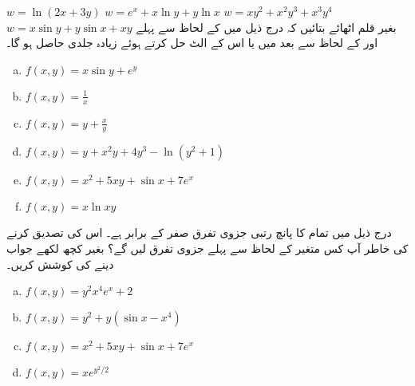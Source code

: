 $w=\ln(2x+3y)$
$w=e^x+x\ln y+y\ln x$
$w=xy^2+x^2y^3+x^3y^4$
$w=x\sin y+y\sin x+xy$
بغیر قلم اٹھائے   بتائیں کہ درج ذیل میں  کے لحاظ سے پہلے اور  کے  لحاظ سے بعد میں یا اس کے الٹ حل کرتے ہوئے   زیادہ جلدی حاصل ہو گا۔
\begin{enumerate}[a.]
\item
$f(x,y)=x\sin y+e^y$
\item
$f(x,y)=\frac{1}{x}$
\item
$f(x,y)=y+\frac{x}{y}$
\item
$f(x,y)=y+x^2y+4y^3-\ln(y^2+1)$
\item
$f(x,y)=x^2+5xy+\sin x+7e^x$
\item
$f(x,y)=x\ln xy$
\end{enumerate}
درج ذیل میں تمام کا پانچ رتبی جزوی تفرق  صفر کے برابر ہے۔ اس کی تصدیق کرنے کی خاطر آپ کس متغیر کے لحاظ سے پہلے جزوی تفرق لیں گے؟ بغیر کچھ لکھے جواب دینے کی کوشش کریں۔
\begin{enumerate}[a.]
\item
$f(x,y)=y^2x^4e^x+2$
\item
$f(x,y)=y^2+y(\sin x-x^4)$
\item
$f(x,y)=x^2+5xy+\sin x+7e^x$
\item
$f(x,y)=xe^{y^2/2}$
\end{enumerate}

